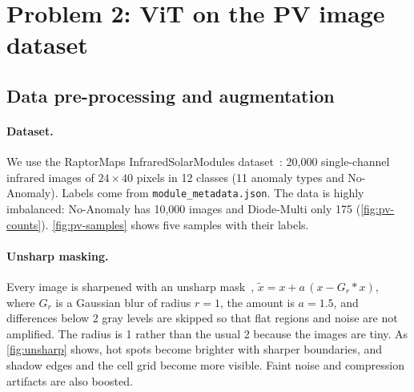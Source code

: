 \documentclass[10pt,twocolumn,letterpaper]{article}
\begin{document}

\section{Problem 2: ViT on the PV image dataset}
\label{sec:p2}

\subsection{Data pre-processing and augmentation}
\label{sec:p2-1}
\paragraph{Dataset.}
We use the RaptorMaps InfraredSolarModules dataset~\cite{millendorf2020pv}: 20{,}000 single-channel infrared images of $24{\times}40$ pixels in 12 classes (11 anomaly types and No-Anomaly). Labels come from \texttt{module\_metadata.json}. The data is highly imbalanced: No-Anomaly has 10{,}000 images and Diode-Multi only 175 (\cref{fig:pv-counts}). \cref{fig:pv-samples} shows five samples with their labels.

\paragraph{Unsharp masking.}
Every image is sharpened with an unsharp mask~\cite{gonzalez2018dip}, $\tilde x = x + a\,(x - G_r * x)$, where $G_r$ is a Gaussian blur of radius $r{=}1$, the amount is $a{=}1.5$, and differences below 2 gray levels are skipped so that flat regions and noise are not amplified. The radius is 1 rather than the usual 2 because the images are tiny. As \cref{fig:unsharp} shows, hot spots become brighter with sharper boundaries, and shadow edges and the cell grid become more visible. Faint noise and compression artifacts are also boosted.
\end{document}
